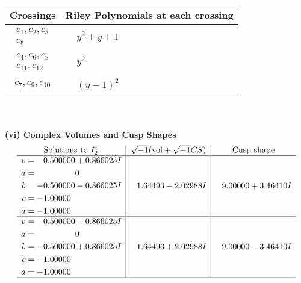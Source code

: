 \documentclass[1p]{elsarticle_modified}
\theoremstyle{definition}
\newcommand{\I}{\sqrt{-1}}
\begin{document}
\begin{tabular}{m{50pt}|m{274pt}}
Crossings & \hspace{64pt}Riley Polynomials at each crossing \\
\hline $$\begin{aligned}c_{1},c_{2},c_{3}\\c_{5}\end{aligned}$$&$\begin{aligned}
&y^2+y+1
\end{aligned}$\\
\hline $$\begin{aligned}c_{4},c_{6},c_{8}\\c_{11},c_{12}\end{aligned}$$&$\begin{aligned}
&y^2
\end{aligned}$\\
\hline $$\begin{aligned}c_{7},c_{9},c_{10}\end{aligned}$$&$\begin{aligned}
&(y-1)^2
\end{aligned}$\\
\hline
\end{tabular}\\~\\
\newpage\flushleft \textbf{(vi) Complex Volumes and Cusp Shapes}
$$\begin{array}{c|c|c}  
\text{Solutions to }I^v_{2}& \I (\text{vol} + \sqrt{-1}CS) & \text{Cusp shape}\\
 \hline 
\begin{aligned}
v &= \phantom{-}0.500000 + 0.866025 I \\
a &= \phantom{-0.000000 } 0 \\
b &= -0.500000 - 0.866025 I \\
c &= -1.00000\phantom{ +0.000000I} \\
d &= -1.00000\phantom{ +0.000000I}\end{aligned}
 & \phantom{-}1.64493 - 2.02988 I & \phantom{-}9.00000 + 3.46410 I \\ \hline\begin{aligned}
v &= \phantom{-}0.500000 - 0.866025 I \\
a &= \phantom{-0.000000 } 0 \\
b &= -0.500000 + 0.866025 I \\
c &= -1.00000\phantom{ +0.000000I} \\
d &= -1.00000\phantom{ +0.000000I}\end{aligned}
 & \phantom{-}1.64493 + 2.02988 I & \phantom{-}9.00000 - 3.46410 I\\
 \hline 
 \end{array}$$\newpage\newpage\renewcommand{\arraystretch}{1}
\end{document}
